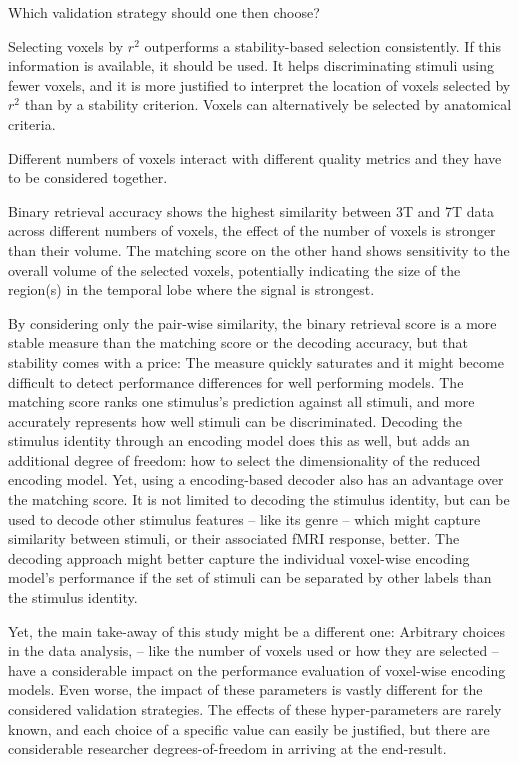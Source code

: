 Which validation strategy should one then choose?

Selecting voxels by $r^2$ outperforms a stability-based selection consistently.
If this information is available, it should be used. It helps
discriminating stimuli using fewer voxels, and it is more justified to interpret
the location of voxels selected by $r^2$ than by a stability criterion.
Voxels can alternatively be selected by anatomical criteria.

Different numbers of voxels interact with different quality metrics and they
have to be considered together. 

Binary retrieval accuracy shows the highest similarity between 3T and 7T data
across different numbers of voxels, the effect of the number of voxels is
stronger than their volume. The matching score on the other hand shows
sensitivity to the overall volume of the selected voxels, potentially indicating
the size of the region(s) in the temporal lobe where the signal is strongest.

By considering only the pair-wise similarity, the binary retrieval score is a more stable measure than the matching
score or the decoding accuracy, but that stability comes with a price: The measure
quickly saturates and it might become difficult to detect performance
differences for well performing models. The matching score ranks one
stimulus's prediction against all stimuli, and more accurately represents how
well stimuli can be discriminated. Decoding the stimulus identity through an
encoding model does this as well, but adds an additional degree of freedom: how to select the dimensionality
of the reduced encoding model. Yet, using a encoding-based  decoder also has an
advantage over the matching score. It is not limited to decoding the
stimulus identity, but can be used to decode other stimulus features -- like its
genre -- which might capture similarity between stimuli, or their associated
f{MRI} response, better. The decoding approach might better capture the individual voxel-wise encoding
model's performance if the set of stimuli can be separated by other labels than the stimulus identity.

Yet, the main take-away of this study might be a different one: Arbitrary
choices in the data analysis, -- like the number of voxels used or how they are
selected -- have a considerable impact on the performance evaluation of
voxel-wise encoding models. Even worse, the impact of these parameters is vastly
different for the considered validation strategies. The effects of these
hyper-parameters are rarely known, and each choice of a specific value can
easily be justified, but there are considerable researcher degrees-of-freedom
\citep{SNS11} in arriving at the end-result.

